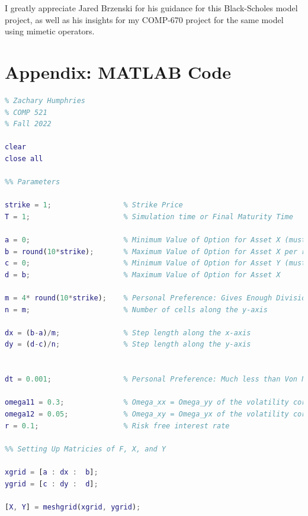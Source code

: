 \documentclass[12pt,letterpaper]{article}
\begin{document}
I greatly appreciate Jared Brzenski for his guidance for this Black-Scholes model project, as well as his insights for my COMP-670 project for the same model using mimetic operators.

\newpage

\printbibliography

\newpage

\section*{Appendix: MATLAB Code}

\begin{lstlisting}[language = Matlab]
%% 2D Black-Scholes PDE
% Zachary Humphries
% COMP 521
% Fall 2022

clear
close all

%% Parameters

strike = 1;                 % Strike Price
T = 1;                      % Simulation time or Final Maturity Time

a = 0;                      % Minimum Value of Option for Asset X (must be zero)
b = round(10*strike);       % Maximum Value of Option for Asset X per recommendation of reference paper (between 8*K and 12*K)
c = 0;                      % Minimum Value of Option for Asset Y (must be zero)
d = b;                      % Maximum Value of Option for Asset X

m = 4* round(10*strike);    % Personal Preference: Gives Enough Divisions for a More Accurate Result
n = m;                      % Number of cells along the y-axis

dx = (b-a)/m;               % Step length along the x-axis
dy = (d-c)/n;               % Step length along the y-axis


dt = 0.001;                 % Personal Preference: Much less than Von Neumann stability criterion for explicit scheme dx^2/(4) (about 0.0039)

omega11 = 0.3;              % Omega_xx = Omega_yy of the volatility correlation matrix
omega12 = 0.05;             % Omega_xy = Omega_yx of the volatility correlation matrix
r = 0.1;                    % Risk free interest rate

%% Setting Up Matricies of F, X, and Y

xgrid = [a : dx :  b];
ygrid = [c : dy :  d];

[X, Y] = meshgrid(xgrid, ygrid);


\end{lstlisting}
\end{document}
